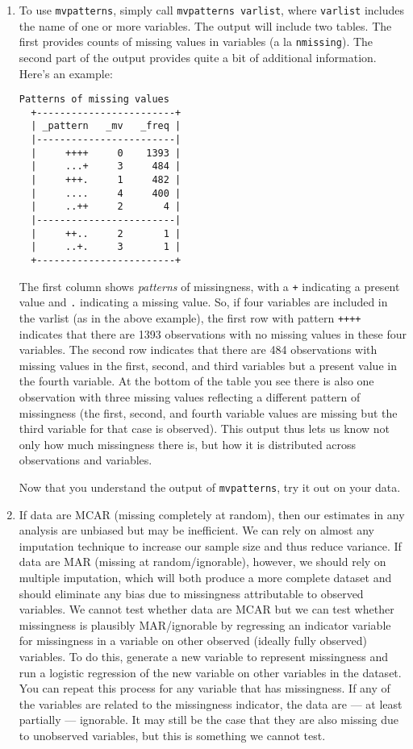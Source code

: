 \documentclass[a4paper,12pt]{article}
\begin{document}
\begin{enumerate}
\item To use \texttt{mvpatterns}, simply call \texttt{mvpatterns varlist}, where \texttt{varlist} includes the name of one or more variables. The output will include two tables. The first provides counts of missing values in variables (a la \texttt{nmissing}). The second part of the output provides quite a bit of additional information. Here's an example:
\begin{verbatim}
Patterns of missing values
  +------------------------+
  | _pattern   _mv   _freq |
  |------------------------|
  |     ++++     0    1393 |
  |     ...+     3     484 |
  |     +++.     1     482 |
  |     ....     4     400 |
  |     ..++     2       4 |
  |------------------------|
  |     ++..     2       1 |
  |     ..+.     3       1 |
  +------------------------+
\end{verbatim}

The first column shows {\em patterns} of missingness, with a \texttt{+} indicating a present value and \texttt{.} indicating a missing value. So, if four variables are included in the varlist (as in the above example), the first row with pattern \texttt{++++} indicates that there are 1393 observations with no missing values in these four variables. The second row indicates that there are 484 observations with missing values in the first, second, and third variables but a present value in the fourth variable. At the bottom of the table you see there is also one observation with three missing values reflecting a different pattern of missingness (the first, second, and fourth variable values are missing but the third variable for that case is observed). This output thus lets us know not only how much missingness there is, but how it is distributed across observations and variables.

Now that you understand the output of \texttt{mvpatterns}, try it out on your data.




\item If data are MCAR (missing completely at random), then our estimates in any analysis are unbiased but may be inefficient. We can rely on almost any imputation technique to increase our sample size and thus reduce variance. If data are MAR (missing at random/ignorable), however, we should rely on multiple imputation, which will both produce a more complete dataset and should eliminate any bias due to missingness attributable to observed variables. We cannot test whether data are MCAR but we can test whether missingness is plausibly MAR/ignorable by regressing an indicator variable for missingness in a variable on other observed (ideally fully observed) variables. To do this, generate a new variable to represent missingness and run a logistic regression of the new variable on other variables in the dataset. You can repeat this process for any variable that has missingness. If any of the variables are related to the missingness indicator, the data are --- at least partially --- ignorable. It may still be the case that they are also missing due to unobserved variables, but this is something we cannot test.


\end{enumerate}
\end{document}
